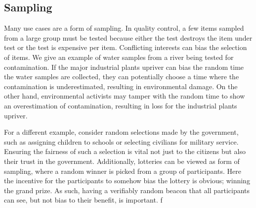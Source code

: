 \subsection{Sampling}

Many use cases are a form of sampling. In quality control, a few items sampled from a large group must be tested because either the test destroys the item under test or the test is expensive per item. Conflicting interests can bias the selection of items. We give an example of water samples from a river being tested for contamination. If the major industrial plants upriver can bias the random time the water samples are collected, they can potentially choose a time where the contamination is underestimated, resulting in environmental damage. On the other hand, environmental activists may tamper with the random time to show an overestimation of contamination, resulting in loss for the industrial plants upriver.

For a different example, consider random selections made by the government, such as assigning children to schools or selecting civilians for military service. Ensuring the fairness of such a selection is vital not just to the citizens but also their trust in the government.
Additionally, lotteries can be viewed as form of sampling, where a random winner is picked from a group of participants. Here the incentive for the participants to somehow bias the lottery is obvious; winning the grand prize. As such, having a verifiably random beacon that all participants can see, but not bias to their benefit, is important. f

